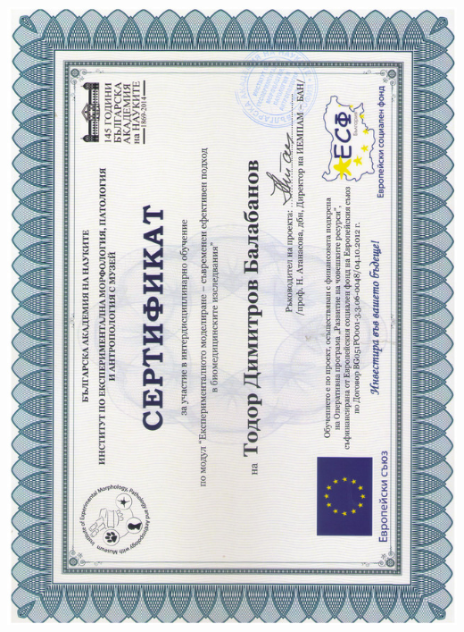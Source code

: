 \documentclass[english,a4paper]{europasscv}
\begin{document}
\includegraphics[width=\textwidth,height=\textheight,keepaspectratio]{IEMPAM2014_3}
\end{document}
